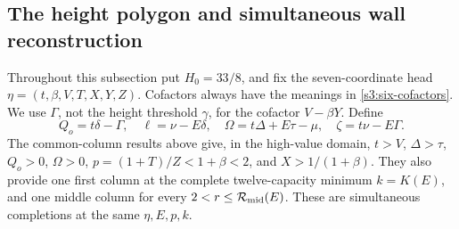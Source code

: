 \documentclass[11pt,reqno]{amsart}
\theoremstyle{definition}
\theoremstyle{remark}
\newcommand{\gam}{\gamma}
\begin{document}
\subsection{The height polygon and simultaneous wall reconstruction}
\label{s3:wall-calculus}

Throughout this subsection put \(H_0=33/8\), and fix the seven-coordinate
head \(\eta=(t,\beta,V,T,X,Y,Z)\). Cofactors always have the meanings in
\eqref{s3:six-cofactors}. We use \(\Gamma\), not the height threshold
\(\gam\), for the cofactor \(V-\beta Y\). Define
\[
 Q_o=t\delta-\Gamma,\quad \ell=\nu-E\delta,\quad
 \Omega=t\Delta+E\tau-\mu,\quad \zeta=t\nu-E\Gamma.
\]
The common-column results above give, in the high-value domain,
\(t>V\), \(\Delta>\tau\), \(Q_o>0\), \(\Omega>0\),
\(p=(1+T)/Z<1+\beta<2\), and \(X>1/(1+\beta)\).
They also provide one first column at the complete twelve-capacity
minimum \(k=K(E)\), and one middle column for every
\(2<r\le\mathcal R_{\rm mid}(E)\). These are simultaneous
completions at the same \(\eta,E,p,k\).
\end{document}
